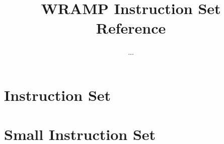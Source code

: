 \documentclass[a4paper]{book}
\title{WRAMP Instruction Set Reference}
\author{...}
\begin{document}
\chapter{Instruction Set}

\chapter{Small Instruction Set}
\addtolength{\hoffset}{-1cm}
\addtolength{\textwidth}{1cm}

\end{document}
